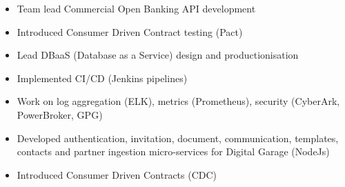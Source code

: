 \documentclass[10pt,a4paper]{altacv}
\begin{document}

\begin{fullwidth}
\makecvheader
\end{fullwidth}


\begin{itemize}
\item Team lead Commercial Open Banking API development
\item Introduced Consumer Driven Contract testing (Pact)
\end{itemize}

\divider
{}
\begin{itemize}
\item Lead DBaaS (Database as a Service) design and productionisation
\item Implemented CI/CD (Jenkins pipelines)
\item Work on log aggregation (ELK), metrics (Prometheus), security (CyberArk, PowerBroker, GPG)
\end{itemize}

\divider

\begin{itemize}
\item Developed authentication, invitation, document, communication, templates, contacts and partner ingestion micro-services for Digital Garage (NodeJs)
\item Introduced Consumer Driven Contracts (CDC)
\end{itemize}

\divider
\end{document}

